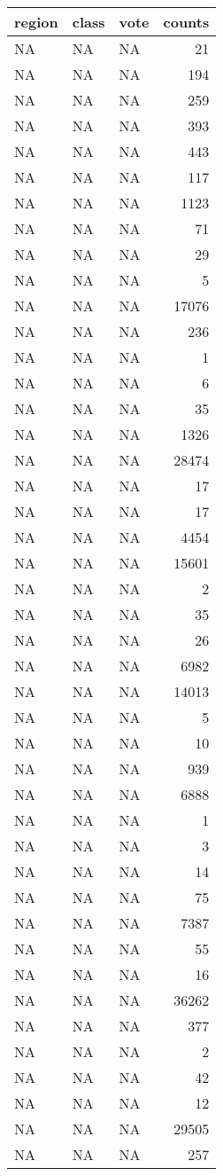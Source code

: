 \documentclass[
]{article}
\begin{document}
\begin{longtable}[]{@{}lllr@{}}
\toprule
region & class & vote & counts\tabularnewline
\midrule
\endhead
NA & NA & NA & 21\tabularnewline
NA & NA & NA & 194\tabularnewline
NA & NA & NA & 259\tabularnewline
NA & NA & NA & 393\tabularnewline
NA & NA & NA & 443\tabularnewline
NA & NA & NA & 117\tabularnewline
NA & NA & NA & 1123\tabularnewline
NA & NA & NA & 71\tabularnewline
NA & NA & NA & 29\tabularnewline
NA & NA & NA & 5\tabularnewline
NA & NA & NA & 17076\tabularnewline
NA & NA & NA & 236\tabularnewline
NA & NA & NA & 1\tabularnewline
NA & NA & NA & 6\tabularnewline
NA & NA & NA & 35\tabularnewline
NA & NA & NA & 1326\tabularnewline
NA & NA & NA & 28474\tabularnewline
NA & NA & NA & 17\tabularnewline
NA & NA & NA & 17\tabularnewline
NA & NA & NA & 4454\tabularnewline
NA & NA & NA & 15601\tabularnewline
NA & NA & NA & 2\tabularnewline
NA & NA & NA & 35\tabularnewline
NA & NA & NA & 26\tabularnewline
NA & NA & NA & 6982\tabularnewline
NA & NA & NA & 14013\tabularnewline
NA & NA & NA & 5\tabularnewline
NA & NA & NA & 10\tabularnewline
NA & NA & NA & 939\tabularnewline
NA & NA & NA & 6888\tabularnewline
NA & NA & NA & 1\tabularnewline
NA & NA & NA & 3\tabularnewline
NA & NA & NA & 14\tabularnewline
NA & NA & NA & 75\tabularnewline
NA & NA & NA & 7387\tabularnewline
NA & NA & NA & 55\tabularnewline
NA & NA & NA & 16\tabularnewline
NA & NA & NA & 36262\tabularnewline
NA & NA & NA & 377\tabularnewline
NA & NA & NA & 2\tabularnewline
NA & NA & NA & 42\tabularnewline
NA & NA & NA & 12\tabularnewline
NA & NA & NA & 29505\tabularnewline
NA & NA & NA & 257\tabularnewline
\bottomrule
\end{longtable}
\end{document}
